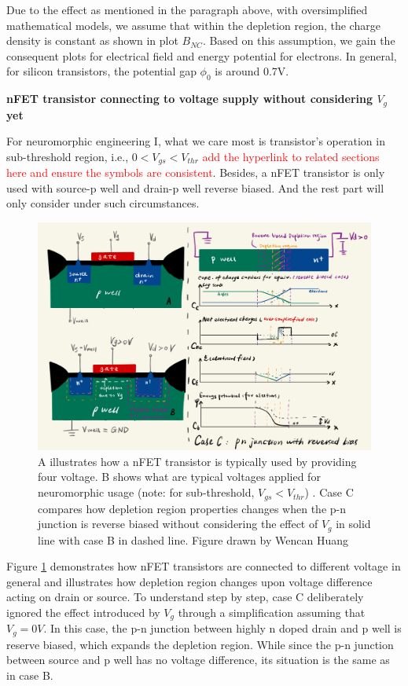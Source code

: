 Due to the effect as mentioned in the paragraph above, with oversimplified mathematical models, we assume that within the depletion region, the charge density is constant as shown in plot \(B_{NC}\). Based on this assumption, we gain the consequent plots for electrical field and energy potential for electrons. In general, for silicon transistors, the potential gap \(\phi_{0}\) is around 0.7V. 

\bigskip
\noindent\textbf{nFET transistor connecting to voltage supply without considering \(V_{g}\) yet}

For neuromorphic engineering I, what we care most is transistor's operation in sub-threshold region, i.e., \( 0 < V_{gs} < V_{thr}\) \textcolor{red}{add the hyperlink to related sections here and ensure the symbols are consistent}. Besides, a nFET transistor is only used with source-p well and drain-p well reverse biased. And the rest part will only consider under such circumstances. 

\begin{figure}[H]
    \centering
    \includegraphics[width=0.9\linewidth]{Figures/PNjunc4Transistor_2.jpeg}
    \caption{A illustrates how a nFET transistor is typically used by providing four voltage. B shows what are typical voltages applied for neuromorphic usage (note: for sub-threshold, \(V_{gs}<V_{thr}\)) . Case C compares how depletion region properties changes when the p-n junction is reverse biased without considering the effect of \(V_g\) in solid line with case B in dashed line. Figure drawn by Wencan Huang}
    \label{fig:342_transistor_2}
\end{figure}

Figure \ref{fig:342_transistor_2} demonstrates how nFET transistors are connected to different voltage in general and illustrates how depletion region changes upon voltage difference acting on drain or source. To understand step by step, case C deliberately ignored the effect introduced by \(V_{g}\) through a simplification assuming that \(V_{g} = 0V\). In this case, the p-n junction between highly n doped drain and p well is reserve biased, which expands the depletion region. While since the p-n junction between source and p well has no voltage difference, its situation is the same as in case B. 

